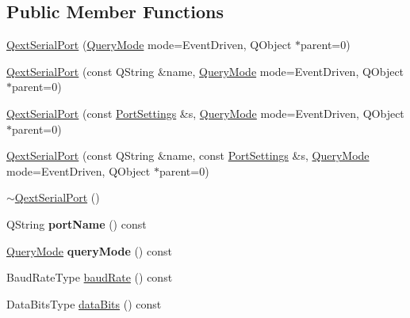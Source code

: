 \subsection*{Public Member Functions}
\begin{DoxyCompactItemize}
\item 
\mbox{\hyperlink{class_qext_serial_port_af9bd56447247a8f2b561592f53cf063f}{Qext\+Serial\+Port}} (\mbox{\hyperlink{class_qext_serial_port_a269e1f3656224a10c321bd70ab89cf64}{Query\+Mode}} mode=Event\+Driven, Q\+Object $\ast$parent=0)
\item 
\mbox{\hyperlink{class_qext_serial_port_ab0376896b79bb9dc099bf102f01e5afa}{Qext\+Serial\+Port}} (const Q\+String \&name, \mbox{\hyperlink{class_qext_serial_port_a269e1f3656224a10c321bd70ab89cf64}{Query\+Mode}} mode=Event\+Driven, Q\+Object $\ast$parent=0)
\item 
\mbox{\hyperlink{class_qext_serial_port_a990ab7ac41bbfe2e9ec2e247145bd49e}{Qext\+Serial\+Port}} (const \mbox{\hyperlink{struct_port_settings}{Port\+Settings}} \&s, \mbox{\hyperlink{class_qext_serial_port_a269e1f3656224a10c321bd70ab89cf64}{Query\+Mode}} mode=Event\+Driven, Q\+Object $\ast$parent=0)
\item 
\mbox{\hyperlink{class_qext_serial_port_a31c6182fc721b775231c5cc4b1ab98de}{Qext\+Serial\+Port}} (const Q\+String \&name, const \mbox{\hyperlink{struct_port_settings}{Port\+Settings}} \&s, \mbox{\hyperlink{class_qext_serial_port_a269e1f3656224a10c321bd70ab89cf64}{Query\+Mode}} mode=Event\+Driven, Q\+Object $\ast$parent=0)
\item 
\mbox{\hyperlink{class_qext_serial_port_af2c6a3071f1aa5d50e77ed31a453fed8}{$\sim$\+Qext\+Serial\+Port}} ()
\item 
\mbox{\label{class_qext_serial_port_a4e2de47edc32d7e5c6827c55534e23da}} 
Q\+String {\bfseries port\+Name} () const
\item 
\mbox{\label{class_qext_serial_port_a2a89b9bd0be1a9e0f817acd77f11842f}} 
\mbox{\hyperlink{class_qext_serial_port_a269e1f3656224a10c321bd70ab89cf64}{Query\+Mode}} {\bfseries query\+Mode} () const
\item 
Baud\+Rate\+Type \mbox{\hyperlink{class_qext_serial_port_aca6d359f346c3938ee13fef282fc4844}{baud\+Rate}} () const
\item 
Data\+Bits\+Type \mbox{\hyperlink{class_qext_serial_port_a8f1822355b63a38924d4f3c9e8b6ae8a}{data\+Bits}} () const
\item 

\end{DoxyCompactItemize}
